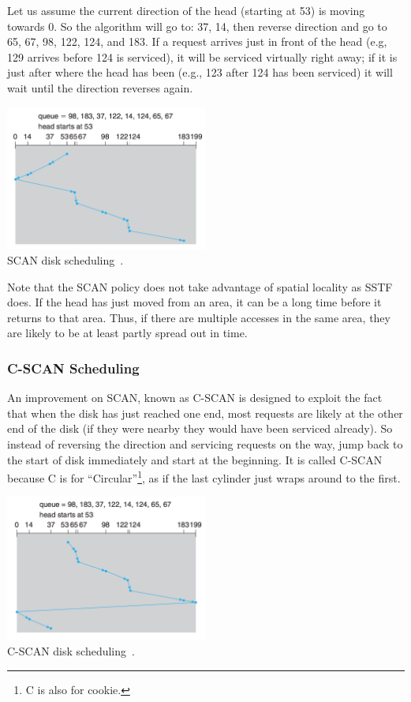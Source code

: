 Let us assume the current direction of the head (starting at 53) is moving towards 0. So the algorithm will go to: 37, 14, then reverse direction and go to 65, 67, 98, 122, 124, and 183. If a request arrives just in front of the head (e.g, 129 arrives before 124 is serviced), it will be serviced virtually right away; if it is just after where the head has been (e.g., 123 after 124 has been serviced) it will wait until the direction reverses again. 

\begin{center}
	\includegraphics[width=0.5\textwidth]{images/disk-scan.png}\\
	SCAN disk scheduling~\cite{osc}.
\end{center}

Note that the SCAN policy does not take advantage of spatial locality as SSTF does. If the head has just moved from an area, it can be a long time before it returns to that area. Thus, if there are multiple accesses in the same area, they are likely to be at least partly spread out in time.

\subsubsection*{C-SCAN Scheduling}

An improvement on SCAN, known as C-SCAN is designed to exploit the fact that when the disk has just reached one end, most requests are likely at the other end of the disk (if they were nearby they would have been serviced already). So instead of reversing the direction and servicing requests on the way, jump back to the start of disk immediately and start at the beginning. It is called C-SCAN because C is for ``Circular''\footnote{C is also for cookie.}, as if the last cylinder just wraps around to the first.

\begin{center}
	\includegraphics[width=0.5\textwidth]{images/disk-cscan.png}\\
	C-SCAN disk scheduling~\cite{osc}.
\end{center}


